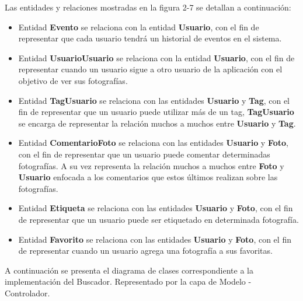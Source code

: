 \documentclass{memoria}
\begin{document}
Las entidades y relaciones mostradas en la figura 2-7 se detallan a continuación:

\begin{itemize}
\item Entidad \textbf{Evento} se relaciona con la entidad \textbf{Usuario}, con el fin de representar que cada usuario tendrá un historial de eventos en el sistema.
\item Entidad \textbf{UsuarioUsuario} se relaciona con la entidad \textbf{Usuario}, con el fin de representar cuando un usuario sigue a otro usuario de la aplicación con el objetivo de ver sus fotografías.
\item Entidad \textbf{TagUsuario} se relaciona con las entidades \textbf{Usuario} y \textbf{Tag}, con el fin de representar que un usuario puede utilizar más de un tag, \textbf{TagUsuario} se encarga de representar la relación muchos a muchos entre \textbf{Usuario} y \textbf{Tag}.
\item Entidad \textbf{ComentarioFoto} se relaciona con las entidades \textbf{Usuario} y \textbf{Foto}, con el fin de representar que un usuario puede comentar determinadas fotografías. A su vez representa la relación muchos a muchos entre \textbf{Foto} y \textbf{Usuario} enfocada a los comentarios que estos últimos realizan sobre las fotografías.
\item Entidad \textbf{Etiqueta} se relaciona con las entidades \textbf{Usuario} y \textbf{Foto}, con el fin de representar que un usuario puede ser etiquetado en determinada fotografía.
\item Entidad \textbf{Favorito} se relaciona con las entidades \textbf{Usuario} y \textbf{Foto}, con el fin de representar cuando un usuario agrega una fotografía a sus favoritas.
\end{itemize}

\newpage
{}

A continuación se presenta el diagrama de clases correspondiente a la implementación del Buscador. Representado por la capa de Modelo - Controlador.
\end{document}
